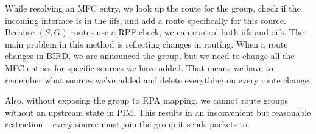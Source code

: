 While resolving an MFC entry, we look up the route for the group, check if the
incoming interface is in the iifs, and add a route specifically for this
source. Because $(S,G)$ routes use a RPF check, we can control both iifs and
oifs. The main problem in this method is reflecting changes in routing. When
a route changes in BIRD, we are announced the group, but we need to change all
the MFC entries for specific sources we have added. That means we have to
remember what sources we've added and delete everything on every route change.

Also, without exposing the group to RPA mapping, we cannot route groups without
an upstream state in PIM. This results in an inconvenient but reasonable
restriction -- every source must join the group it sends packets to.
